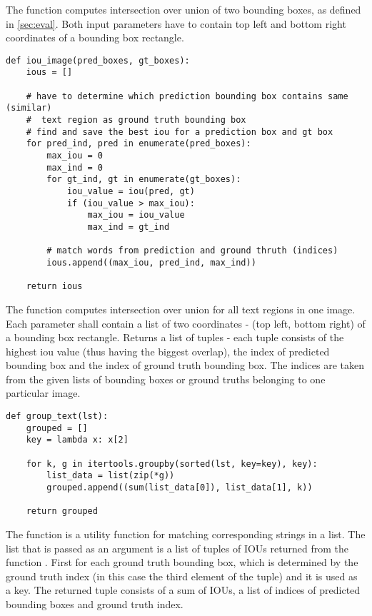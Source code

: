 The function  computes intersection over union of two bounding boxes, as defined in \ref*{sec:eval}. Both input parameters have to contain top left and bottom right coordinates of a bounding box rectangle.

\begin{lstlisting}[caption=iou\_image]
def iou_image(pred_boxes, gt_boxes):
    ious = []

    # have to determine which prediction bounding box contains same (similar) 
    #  text region as ground truth bounding box
    # find and save the best iou for a prediction box and gt box
    for pred_ind, pred in enumerate(pred_boxes):
        max_iou = 0
        max_ind = 0
        for gt_ind, gt in enumerate(gt_boxes):
            iou_value = iou(pred, gt)
            if (iou_value > max_iou):
                max_iou = iou_value
                max_ind = gt_ind

        # match words from prediction and ground thruth (indices)     
        ious.append((max_iou, pred_ind, max_ind))

    return ious

\end{lstlisting}

The function  computes intersection over union for all text regions in one image.
Each parameter shall contain a list of two coordinates - (top left, bottom right) of a bounding box rectangle.
Returns a list of tuples - each tuple consists of the highest iou value (thus having the biggest overlap), the index of predicted bounding box and  the index of ground truth bounding box. The indices are taken from the given lists of bounding boxes or ground truths belonging to one particular image.

\begin{lstlisting}[caption=group\_text]
def group_text(lst):
    grouped = []
    key = lambda x: x[2]

    for k, g in itertools.groupby(sorted(lst, key=key), key):
        list_data = list(zip(*g))
        grouped.append((sum(list_data[0]), list_data[1], k))

    return grouped
\end{lstlisting}

The function  is a utility function for matching corresponding strings in a list. The list that is passed as an argument is a list of tuples of IOUs returned from the function . First for each ground truth bounding box, which is determined by the ground truth index (in this case the third element of the tuple) and it is used as a key. The returned tuple consists of a sum of IOUs, a list of indices of predicted bounding boxes and ground truth index.

